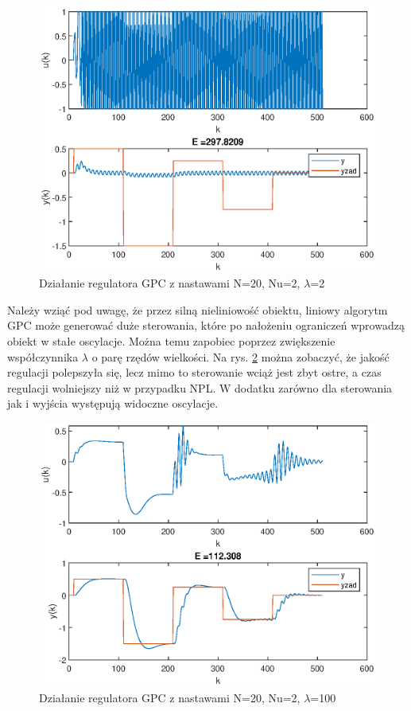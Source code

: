 		\begin{figure}[h!]
			\centering
			\includegraphics[width=\linewidth]{img/GPC.eps}
			\caption{Działanie regulatora GPC z nastawami N=20, Nu=2, $\lambda$=2}
			\label{fig:GPC}
		\end{figure}
	
		\newpage
		Należy wziąć pod uwagę, że przez silną nieliniowość obiektu, liniowy algorytm GPC może generować duże sterowania, które po nałożeniu ograniczeń wprowadzą obiekt w stałe oscylacje. Można temu zapobiec poprzez zwiększenie współczynnika $\lambda$ o parę rzędów wielkości. Na rys. \ref{fig:GPC100} można zobaczyć, że jakość regulacji polepszyła się, lecz mimo to sterowanie wciąż jest zbyt ostre, a czas regulacji wolniejszy niż w przypadku NPL. W dodatku zarówno dla sterowania jak i wyjścia występują widoczne oscylacje.
		\begin{figure}[h!]
			\centering
			\includegraphics[width=\linewidth]{img/GPC100.eps}
			\caption{Działanie regulatora GPC z nastawami N=20, Nu=2, $\lambda$=100}
			\label{fig:GPC100}
		\end{figure}